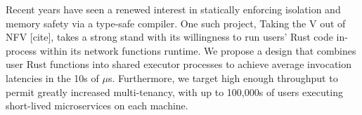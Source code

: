 Recent years have seen a renewed interest in statically enforcing isolation and memory safety via a type-safe compiler.
One such project, Taking the V out of NFV [cite], takes a strong stand with its willingness to run users' Rust code in-process within its network functions runtime.
We propose a design that combines user Rust functions into shared executor processes to achieve average invocation latencies in the 10s of $\mu$s.
Furthermore, we target high enough throughput to permit greatly increased multi-tenancy, with up to 100,000s of users executing short-lived microservices on each machine.
